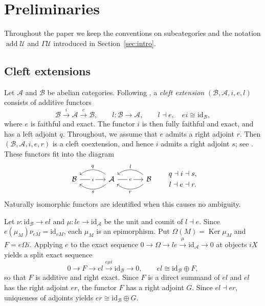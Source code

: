 \documentclass[11pt]{amsart}
\theoremstyle{definition}
\theoremstyle{remark}
\theoremstyle{plain}
\numberwithin{equation}{section}
\begin{document}
\section{Preliminaries}\label{sec:preliminaries}

Throughout the paper we keep the conventions on subcategories and the
notation $\operatorname{add}\mathcal{U}$ and $\Gamma\mathcal{U}$ introduced in
Section~\ref{sec:intro}.

\subsection{Cleft extensions}\label{subsec:cleft}

Let $\mathcal{A}$ and $\mathcal{B}$ be abelian categories. Following
\cite{BelCleft,BelRelative,Marmaridis}, a \emph{cleft extension}
$(\mathcal{B}, \mathcal{A}, i, e, l)$ consists of additive functors
\[
 \mathcal{B}\xrightarrow{i}\mathcal{A}\xrightarrow{e}\mathcal{B}, \qquad l: \mathcal{B} \to \mathcal{A},
 \qquad
 l \dashv e, \quad ei \cong \mathrm{id}_{\mathcal{B}},
\]
where $e$ is faithful and exact. The functor $i$ is then fully faithful and exact, and has a left adjoint $q$. 
Throughout, we assume that $e$ admits a right adjoint $r$. Then $(\mathcal{B},\mathcal{A},i,e,r)$ is a cleft coextension, and hence $i$ admits a right adjoint $s$; see \cite[Section~2.4]{BelRelative}.
These functors fit into the diagram
\begin{equation}\label{eq:adjunctions}
\begin{tikzcd}[column sep=large]
 \mathcal{B}\arrow[r,"i" description]&
 \mathcal{A}\arrow[l,bend right=40,"q"']
    \arrow[l,bend left=40,"s"]
    \arrow[r,"e" description]&
 \mathcal{B}\arrow[l,bend right=40,"l"']
    \arrow[l,bend left=40,"r"]
\end{tikzcd}
\qquad
\begin{gathered}
 q \dashv i \dashv s, \\
 l \dashv e \dashv r.
\end{gathered}
\end{equation}
Naturally isomorphic functors are identified when this causes no ambiguity.

Let $\nu: \mathrm{id}_{\mathcal{B}} \to el$ and $\mu: le \to \mathrm{id}_{\mathcal{A}}$ be the unit and counit
of $l \dashv e$. Since $e(\mu_M)\nu_{eM} = \mathrm{id}_{eM}$, each $\mu_M$ is an
epimorphism. Put $\Omega(M) = \operatorname{Ker}\mu_M$ and $F = e\Omega i$. Applying $e$
to the exact sequence $0 \to \Omega \to le\xrightarrow{\mu}\mathrm{id}_{\mathcal{A}} \to 0$
at objects $iX$ yields a split exact sequence
\[
 0 \longrightarrow F \longrightarrow el
   \xrightarrow{e\mu i}\mathrm{id}_{\mathcal{B}} \longrightarrow 0,
 \qquad el \cong \mathrm{id}_{\mathcal{B}} \oplus F,
\]
so that $F$ is additive and right exact. Since $F$ is a direct summand of $el$ and $el$ has the
right adjoint $er$, the functor $F$ has a right adjoint $G$. Since $el \dashv er$, uniqueness of adjoints
yields $er \cong \mathrm{id}_{\mathcal{B}} \oplus G$.
\end{document}
